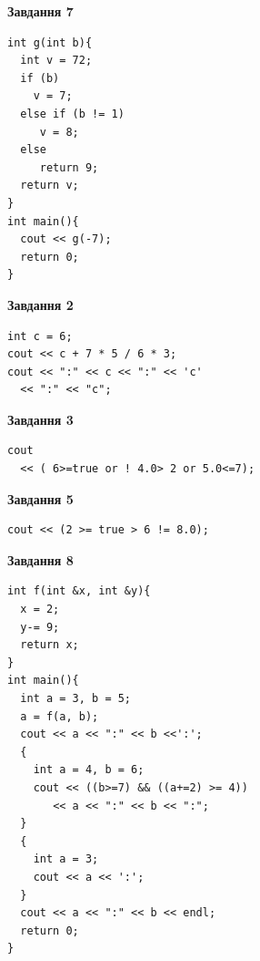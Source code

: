 \documentclass[12pt, ukrainian]{article}
\begin{document}
{\begin {large}
\begin{minipage}[t]{7.0cm}
\begin{center}
\textbf{Завдання 7}
\end{center}
\vspace{-8mm}

\begin{verbatim}
int g(int b){
  int v = 72;
  if (b)
    v = 7;
  else if (b != 1)
     v = 8;
  else
     return 9;
  return v;
}
int main(){
  cout << g(-7);
  return 0;
}
\end{verbatim}

\end{minipage}
\vline \hspace{1mm}
\begin{minipage}[t]{11.0cm}

\begin{center}
\textbf{Завдання 2}
\end{center}
\vspace{-8mm}

\begin{verbatim}
int c = 6;
cout << c + 7 * 5 / 6 * 3;
cout << ":" << c << ":" << 'c' 
  << ":" << "c";
\end{verbatim}



\begin{center}
\textbf{Завдання 3}
\end{center}
\vspace{-8mm}

\begin{verbatim}
cout 
  << ( 6>=true or ! 4.0> 2 or 5.0<=7);
\end{verbatim}



\begin{center}
\textbf{Завдання 5}
\end{center}
\vspace{-8mm}

\begin{verbatim}
cout << (2 >= true > 6 != 8.0);
\end{verbatim}



\begin{center}
\textbf{Завдання 8}
\end{center}
\vspace{-8mm}

\begin{verbatim}
int f(int &x, int &y){
  x = 2;
  y-= 9;
  return x;
}
int main(){
  int a = 3, b = 5;
  a = f(a, b);
  cout << a << ":" << b <<':';
  {
    int a = 4, b = 6;
    cout << ((b>=7) && ((a+=2) >= 4))
       << a << ":" << b << ":";
  }
  {
    int a = 3;
    cout << a << ':';
  }
  cout << a << ":" << b << endl;
  return 0;
}
\end{verbatim}


\end{minipage}
\end{large}}
\end{document}
